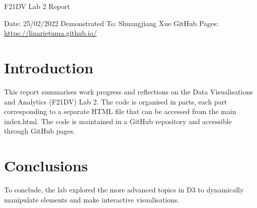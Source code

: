 \documentclass[11pt]{article}   	%
\begin{document}
\begin{center}
  \Huge{F21DV Lab 2 Report}
\end{center}
Date: 25/02/2022 \linebreak
Demonstrated To: Shuangjiang  Xue \linebreak
GitHub Pages: \url{https://linarietuma.github.io/}

\section{Introduction}

This report summarises work progress and reflections on the Data Visualisations and Analytics (F21DV)  Lab 2. The code is organised in parts, each part corresponding to a separate HTML file that can be accessed from the main index.html. The code is maintained in a GitHub repository and accessible through GitHub pages.




\section{Conclusions}
To conclude, the lab explored the more advanced topics in D3 to dynamically manipulate elements and make interactive visualisations.
\end{document}
